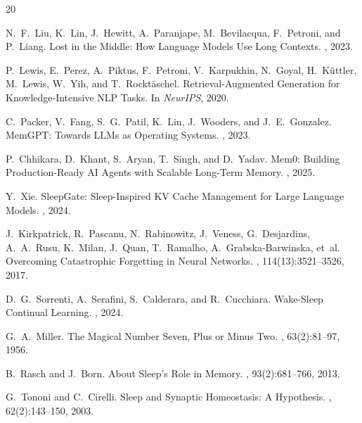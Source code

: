 \documentclass[11pt,twocolumn]{article}
\begin{document}

\begin{thebibliography}{20}

N.~F.~Liu, K.~Lin, J.~Hewitt, A.~Paranjape, M.~Bevilacqua, F.~Petroni, and P.~Liang.
\newblock Lost in the Middle: How Language Models Use Long Contexts.
, 2023.

P.~Lewis, E.~Perez, A.~Piktus, F.~Petroni, V.~Karpukhin, N.~Goyal, H.~K{\"u}ttler, M.~Lewis, W.~Yih, and T.~Rockt{\"a}schel.
\newblock Retrieval-Augmented Generation for Knowledge-Intensive NLP Tasks.
\newblock In {\em NeurIPS}, 2020.

C.~Packer, V.~Fang, S.~G.~Patil, K.~Lin, J.~Wooders, and J.~E.~Gonzalez.
\newblock MemGPT: Towards LLMs as Operating Systems.
, 2023.

P.~Chhikara, D.~Khant, S.~Aryan, T.~Singh, and D.~Yadav.
\newblock Mem0: Building Production-Ready AI Agents with Scalable Long-Term Memory.
, 2025.

Y.~Xie.
\newblock SleepGate: Sleep-Inspired KV Cache Management for Large Language Models.
, 2024.

J.~Kirkpatrick, R.~Pascanu, N.~Rabinowitz, J.~Veness, G.~Desjardins, A.~A.~Rusu, K.~Milan, J.~Quan, T.~Ramalho, A.~Grabska-Barwinska, et~al.
\newblock Overcoming Catastrophic Forgetting in Neural Networks.
, 114(13):3521--3526, 2017.

D.~G.~Sorrenti, A.~Serafini, S.~Calderara, and R.~Cucchiara.
\newblock Wake-Sleep Continual Learning.
, 2024.

G.~A.~Miller.
\newblock The Magical Number Seven, Plus or Minus Two.
, 63(2):81--97, 1956.

B.~Rasch and J.~Born.
\newblock About Sleep's Role in Memory.
, 93(2):681--766, 2013.

G.~Tononi and C.~Cirelli.
\newblock Sleep and Synaptic Homeostasis: A Hypothesis.
, 62(2):143--150, 2003.


\end{thebibliography}
\end{document}

